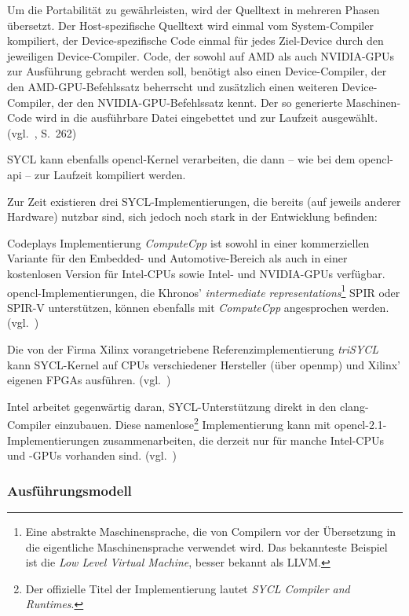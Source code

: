 Um die Portabilität zu gewährleisten, wird der Quelltext in mehreren Phasen
übersetzt. Der Host-spezifische Quelltext wird einmal vom System-Compiler
kompiliert, der Device-spezifische Code einmal für jedes Ziel-Device durch den
jeweiligen Device-Compiler. Code, der sowohl auf AMD als auch NVIDIA-GPUs
zur Ausführung gebracht werden soll, benötigt also einen Device-Compiler,
der den AMD-GPU-Befehlssatz beherrscht und zusätzlich einen weiteren
Device-Compiler, der den NVIDIA-GPU-Befehlssatz kennt. Der so generierte
Maschinen-Code wird in die ausführbare Datei eingebettet und zur Laufzeit
ausgewählt. (vgl.~\cite{syclspec}, S.\ 262)

SYCL kann ebenfalls \gls{opencl}-Kernel verarbeiten, die dann -- wie bei dem
\gls{opencl}-\gls{api} -- zur Laufzeit kompiliert werden.

Zur Zeit existieren drei SYCL-Implementierungen, die bereits (auf jeweils
anderer Hardware) nutzbar sind, sich jedoch noch stark in der Entwicklung
befinden:

Codeplays Implementierung \textit{ComputeCpp} ist sowohl in einer kommerziellen
Variante für den Embedded- und Automotive-Bereich als auch in einer kostenlosen
Version für Intel-CPUs sowie Intel- und NVIDIA-GPUs verfügbar.
\gls{opencl}-Implementierungen, die Khronos'
\textit{intermediate representations}\footnote{Eine abstrakte Maschinensprache,
die von Compilern vor der Übersetzung in die eigentliche Maschinensprache
verwendet wird. Das bekannteste Beispiel ist die
\textit{Low Level Virtual Machine}, besser bekannt als LLVM.} SPIR oder SPIR-V
unterstützen, können ebenfalls mit \textit{ComputeCpp} angesprochen werden.
(vgl.~\cite{computecpp})

Die von der Firma Xilinx vorangetriebene Referenzimplementierung
\textit{triSYCL} kann SYCL-Kernel auf CPUs verschiedener Hersteller (über
\gls{openmp}) und Xilinx' eigenen FPGAs ausführen.
(vgl.~\cite{trisycl})

Intel arbeitet gegenwärtig daran, SYCL-Unterstützung direkt in den
clang-Compiler einzubauen. Diese namenlose\footnote{Der offizielle Titel der
Implementierung lautet \textit{SYCL Compiler and Runtimes}.} Implementierung
kann mit \gls{opencl}-2.1-Implementierungen zusammenarbeiten, die derzeit nur
für manche Intel-CPUs und -GPUs vorhanden sind.
(vgl.~\cite{intelsycl})

\subsubsection{Ausführungsmodell}

